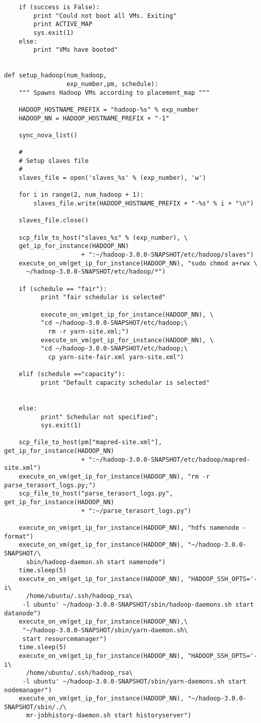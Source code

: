 \begin{verbatim}
    if (success is False):
        print "Could not boot all VMs. Exiting"
        print ACTIVE_MAP
        sys.exit(1)
    else:
        print "VMs have booted"


def setup_hadoop(num_hadoop,
                 exp_number,pm, schedule):
    """ Spawns Hadoop VMs according to placement_map """

    HADOOP_HOSTNAME_PREFIX = "hadoop-%s" % exp_number
    HADOOP_NN = HADOOP_HOSTNAME_PREFIX + "-1"

    sync_nova_list()

    #
    # Setup slaves file
    #
    slaves_file = open('slaves_%s' % (exp_number), 'w')

    for i in range(2, num_hadoop + 1):
        slaves_file.write(HADOOP_HOSTNAME_PREFIX + "-%s" % i + "\n")

    slaves_file.close()

    scp_file_to_host("slaves_%s" % (exp_number), \
    get_ip_for_instance(HADOOP_NN)
                     + ":~/hadoop-3.0.0-SNAPSHOT/etc/hadoop/slaves")
    execute_on_vm(get_ip_for_instance(HADOOP_NN), "sudo chmod a+rwx \
      ~/hadoop-3.0.0-SNAPSHOT/etc/hadoop/*")
   
    if (schedule == "fair"):
          print "fair schedular is selected"
     
          execute_on_vm(get_ip_for_instance(HADOOP_NN), \
          "cd ~/hadoop-3.0.0-SNAPSHOT/etc/hadoop;\
            rm -r yarn-site.xml;")
          execute_on_vm(get_ip_for_instance(HADOOP_NN), \
          "cd ~/hadoop-3.0.0-SNAPSHOT/etc/hadoop;\
            cp yarn-site-fair.xml yarn-site.xml")
          
    elif (schedule =="capacity"):
          print "Default capacity schedular is selected"
 
    
    else:
          print" Schedular not specified";
          sys.exit(1) 
    
    scp_file_to_host(pm["mapred-site.xml"], get_ip_for_instance(HADOOP_NN)
                     + ":~/hadoop-3.0.0-SNAPSHOT/etc/hadoop/mapred-site.xml")
    execute_on_vm(get_ip_for_instance(HADOOP_NN), "rm -r parse_terasort_logs.py;")
    scp_file_to_host("parse_terasort_logs.py", get_ip_for_instance(HADOOP_NN)
                     + ":~/parse_terasort_logs.py")
     
    execute_on_vm(get_ip_for_instance(HADOOP_NN), "hdfs namenode -format")
    execute_on_vm(get_ip_for_instance(HADOOP_NN), "~/hadoop-3.0.0-SNAPSHOT/\
      sbin/hadoop-daemon.sh start namenode")
    time.sleep(5)
    execute_on_vm(get_ip_for_instance(HADOOP_NN), "HADOOP_SSH_OPTS='-i\
      /home/ubuntu/.ssh/hadoop_rsa\
     -l ubuntu' ~/hadoop-3.0.0-SNAPSHOT/sbin/hadoop-daemons.sh start datanode")
    execute_on_vm(get_ip_for_instance(HADOOP_NN),\
     "~/hadoop-3.0.0-SNAPSHOT/sbin/yarn-daemon.sh\
     start resourcemanager")
    time.sleep(5)
    execute_on_vm(get_ip_for_instance(HADOOP_NN), "HADOOP_SSH_OPTS='-i\
      /home/ubuntu/.ssh/hadoop_rsa\
     -l ubuntu' ~/hadoop-3.0.0-SNAPSHOT/sbin/yarn-daemons.sh start nodemanager")
    execute_on_vm(get_ip_for_instance(HADOOP_NN), "~/hadoop-3.0.0-SNAPSHOT/sbin/./\
      mr-jobhistory-daemon.sh start historyserver")


\end{verbatim}
